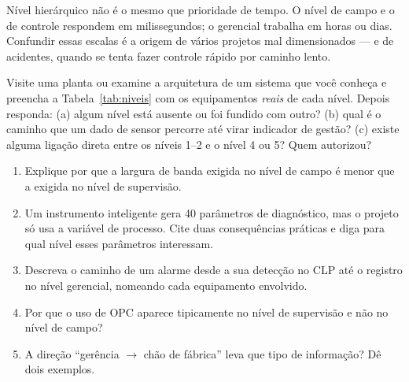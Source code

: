 \begin{atencao}
Nível hierárquico não é o mesmo que prioridade de tempo. O nível de campo e o de controle respondem
em milissegundos; o gerencial trabalha em horas ou dias. Confundir essas escalas é a origem de
vários projetos mal dimensionados --- e de acidentes, quando se tenta fazer controle rápido por
caminho lento.
\end{atencao}

\begin{pratica}
Visite uma planta ou examine a arquitetura de um sistema que você conheça e preencha a
Tabela~\ref{tab:niveis} com os equipamentos \emph{reais} de cada nível. Depois responda:
(a) algum nível está ausente ou foi fundido com outro?
(b) qual é o caminho que um dado de sensor percorre até virar indicador de gestão?
(c) existe alguma ligação direta entre os níveis 1--2 e o nível 4 ou 5? Quem autorizou?
\end{pratica}

\begin{exercicios}
\begin{enumerate}[label=\alph*)]
  \item Explique por que a largura de banda exigida no nível de campo é menor que a exigida no
        nível de supervisão.
  \item Um instrumento inteligente gera 40 parâmetros de diagnóstico, mas o projeto só usa a variável
        de processo. Cite duas consequências práticas e diga para qual nível esses parâmetros
        interessam.
  \item Descreva o caminho de um alarme desde a sua detecção no CLP até o registro no nível
        gerencial, nomeando cada equipamento envolvido.
  \item Por que o uso de OPC aparece tipicamente no nível de supervisão e não no nível de campo?
  \item A direção ``gerência $\rightarrow$ chão de fábrica'' leva que tipo de informação? Dê dois
        exemplos.
\end{enumerate}
\end{exercicios}
